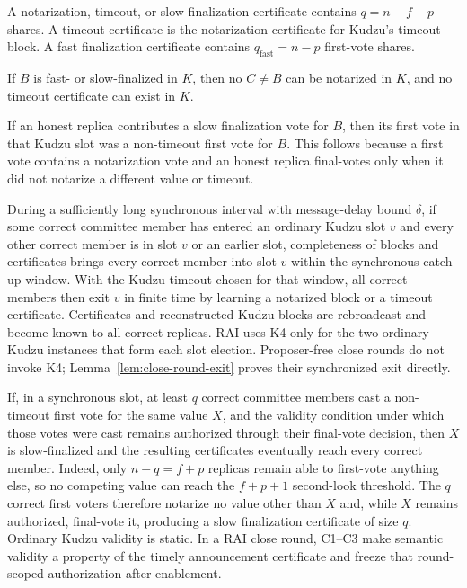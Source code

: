 \documentclass[11pt]{article}
\theoremstyle{definition}
\theoremstyle{remark}
\begin{document}
\begin{description}[leftmargin=2.4em,labelindent=0em]
\item[K1 (certificate thresholds).]
A notarization, timeout, or slow finalization certificate contains $q=n-f-p$ shares. A timeout certificate is the notarization certificate for Kudzu's timeout block. A fast finalization certificate contains $q_{\mathrm{fast}}=n-p$ first-vote shares.

\item[K2 (finalization incompatibility).]
If $B$ is fast- or slow-finalized in $K$, then no $C\ne B$ can be notarized in $K$, and no timeout certificate can exist in $K$.

\item[K3 (honest final voters are non-timeout first voters).]
If an honest replica contributes a slow finalization vote for $B$, then its first vote in that Kudzu slot was a non-timeout first vote for $B$. This follows because a first vote contains a notarization vote and an honest replica final-votes only when it did not notarize a different value or timeout.

\item[K4 (ordinary-slot exit under synchrony).]
During a sufficiently long synchronous interval with message-delay bound $\delta$, if some correct committee member has entered an ordinary Kudzu slot $v$ and every other correct member is in slot $v$ or an earlier slot, completeness of blocks and certificates brings every correct member into slot $v$ within the synchronous catch-up window. With the Kudzu timeout chosen for that window, all correct members then exit $v$ in finite time by learning a notarized block or a timeout certificate. Certificates and reconstructed Kudzu blocks are rebroadcast and become known to all correct replicas. RAI uses K4 only for the two ordinary Kudzu instances that form each slot election. Proposer-free close rounds do not invoke K4; Lemma~\ref{lem:close-round-exit} proves their synchronized exit directly.

\item[K5 ($q$ stable correct first votes finalize).]
If, in a synchronous slot, at least $q$ correct committee members cast a non-timeout first vote for the same value $X$, and the validity condition under which those votes were cast remains authorized through their final-vote decision, then $X$ is slow-finalized and the resulting certificates eventually reach every correct member. Indeed, only $n-q=f+p$ replicas remain able to first-vote anything else, so no competing value can reach the $f+p+1$ second-look threshold. The $q$ correct first voters therefore notarize no value other than $X$ and, while $X$ remains authorized, final-vote it, producing a slow finalization certificate of size $q$. Ordinary Kudzu validity is static. In a RAI close round, C1--C3 make semantic validity a property of the timely announcement certificate and freeze that round-scoped authorization after enablement.


\end{description}
\end{document}
